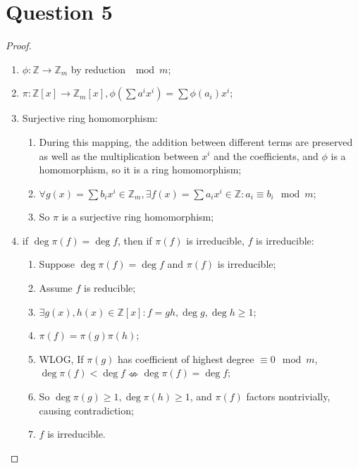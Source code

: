 \documentclass{article}
\begin{document}
\newpage

\section*{Question 5}

\begin{proof}
~
    \begin{enumerate}
        \item $\phi:\mathbb{Z}\to\mathbb{Z}_m$ by reduction $\mod{m}$;
        \item $\pi:\mathbb{Z}[x]\to\mathbb{Z}_m[x],\phi(\sum a^ix^i)=\sum\phi(a_i)x^i$;
        \item Surjective ring homomorphism:
        \begin{enumerate}
            \item During this mapping, the addition between different terms are preserved as well as the multiplication between $x^i$ and the coefficients, and $\phi$ is a homomorphism, so it is a ring homomorphism;
            \item $\forall g(x)=\sum b_ix^i\in\mathbb{Z}_m,\exists f(x)=\sum a_ix^i\in\mathbb{Z}:a_i\equiv b_i\mod{m}$;
            \item So $\pi$ is a surjective ring homomorphism;
        \end{enumerate}
        \item if $\deg \pi(f)=\deg f$, then if $\pi(f)$ is irreducible, $f$ is irreducible:
        \begin{enumerate}
            \item Suppose $\deg \pi(f)=\deg f$ and $\pi(f)$ is irreducible;
            \item Assume $f$ is reducible;
            \item $\exists g(x),h(x)\in\mathbb{Z}[x]:f=gh,\deg g,\deg h\geq1$;
            \item $\pi(f)=\pi(g)\pi(h)$;
            \item WLOG, If $\pi(g)$ has coefficient of highest degree $\equiv 0\mod{m}$, $\deg\pi(f)<\deg f\nLeftrightarrow\deg\pi(f)=\deg f$;
            \item So $\deg \pi(g)\geq1,\deg\pi(h)\geq 1$, and $\pi(f)$ factors nontrivially, causing contradiction;
            \item $f$ is irreducible.
        \end{enumerate}
    \end{enumerate}
\end{proof}

\newpage
\end{document}
